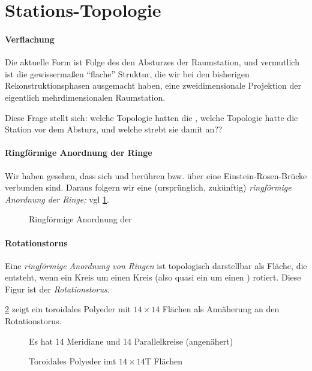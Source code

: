 \section{Stations-Topologie}%
\label{sec:topologie}

\paragraph{Verflachung}
Die aktuelle Form ist Folge des den Absturzes der Raumstation, und vermutlich ist die gewissermaßen "`flache"' Struktur, die wir bei den bisherigen Rekonstruktionsphasen ausgemacht haben, eine zweidimensionale Projektion der eigentlich mehrdimensionalen Raumstation. 

Diese Frage stellt sich: welche Topologie hatten die , welche Topologie hatte die Station vor dem Absturz, und welche strebt sie damit an??

\paragraph{Ringförmige Anordnung der Ringe}
Wir haben gesehen, dass sich  und  berühren bzw. über eine Einstein-Rosen-Brücke verbunden sind. Daraus folgern wir eine (ursprünglich, zukünftig) \emph{ringförmige Anordnung der Ringe;} vgl  \cref{fig:ringring}.

\begin{figure}[ht!]
    \centering
    
    \caption{Ringförmige Anordnung der }
    \label{fig:ringring}
\end{figure}

\paragraph{Rotationstorus}
Eine \emph{ringförmige Anordnung von Ringen }ist topologisch darstellbar als Fläche, die entsteht, wenn ein Kreis um einen Kreis (also quasi ein  um einen ) rotiert. Diese Figur ist der \emph{Rotationstorus}.

\cref{fig:torusweiss}  zeigt ein toroidales Polyeder mit $14\times 14$ Flächen als Annäherung an den Rotationstorus.  

\begin{figure}[ht!]
    \centering
    
    \caption{Toroidales Polyeder imt $14\times 14$T Flächen} Es hat 14  Meridiane und 14 Parallelkreise (angenähert)
    \label{fig:torusweiss}
\end{figure}

